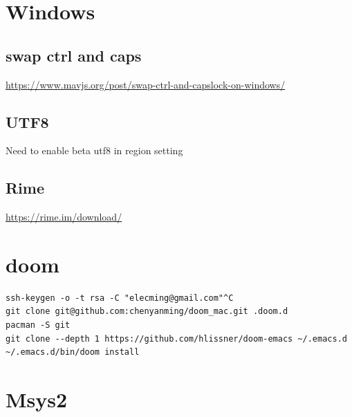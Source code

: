 \documentclass[11pt]{article}
\author{Damon Chan}
\date{\today}
\title{}
\begin{document}
\tableofcontents

\section{Windows}
\label{sec:orgc02b8a6}
\subsection{swap ctrl and caps}
\label{sec:org5ce5bd3}
\url{https://www.mavjs.org/post/swap-ctrl-and-capslock-on-windows/}
\subsection{UTF8}
\label{sec:org40448d1}
Need to enable beta utf8 in region setting
\subsection{Rime}
\label{sec:org25359a0}
\url{https://rime.im/download/}

\section{doom}
\label{sec:org169de61}
\begin{verbatim}
ssh-keygen -o -t rsa -C "elecming@gmail.com"^C
git clone git@github.com:chenyanming/doom_mac.git .doom.d
pacman -S git
git clone --depth 1 https://github.com/hlissner/doom-emacs ~/.emacs.d
~/.emacs.d/bin/doom install
\end{verbatim}

\section{Msys2}
\label{sec:orgda68a4e}
\end{document}
